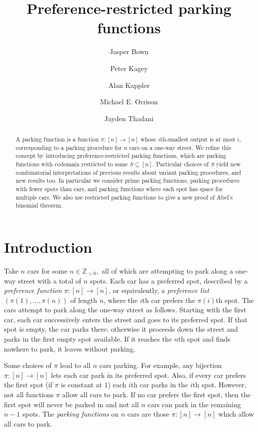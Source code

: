 \documentclass[12pt]{article}
\title{Preference-restricted parking functions}
\author{Jasper Bown \authornote{1} \and Peter Kagey \authornote{2} \and Alan Kappler \authornote{3} \and Michael E. Orrison \authornote{3} \and Jayden Thadani \authornote{3}}
\begin{document}
\maketitle

\begin{abstract}
     A parking function is a function $\pi:[n]\to [n]$ whose $i$th-smallest output is at most $i,$ corresponding to a parking procedure for $n$ cars on a one-way street. We refine this concept by introducing preference-restricted parking functions, which are parking functions with codomain restricted to some $S\subseteq[n]$. Particular choices of $S$ yield new combinatorial interpretations of previous results about variant parking procedures, and new results too. In particular we consider prime parking functions, parking procedures with fewer spots than cars, and parking functions where each spot has space for multiple cars. We also use restricted parking functions to give a new proof of Abel's binomial theorem.
\end{abstract}

\section{Introduction} \label{sec:intro}

Take $n$ cars for some $n\in\mathbb{Z}_{> 0},$ all of which are attempting to park along a one-way street with a total of $n$ spots. Each car has a preferred spot, described by a \emph{preference function} $\pi:[n]\to[n]$, or equivalently, a \emph{preference list} $(\pi(1), \dots, \pi(n))$ of length $n$, where the $i$th car prefers the $\pi(i)$th spot. The cars attempt to park along the one-way street as follows. Starting with the first car, each car successively enters the street and goes to its preferred spot. If that spot is empty, the car parks there; otherwise it proceeds down the street and parks in the first empty spot available. If it reaches the $n$th spot and finds nowhere to park, it leaves without parking.

Some choices of $\pi$ lead to all $n$ cars parking. For example, any bijection $\pi:[n]\to[n]$ lets each car park in its preferred spot. Also, if every car prefers the first spot (if $\pi$ is constant at $1$) each $i$th car parks in the $i$th spot. However, not all functions $\pi$ allow all cars to park. If no car prefers the first spot, then the first spot will never be parked in and not all $n$ cars can park in the remaining $n-1$ spots. The \emph{parking functions} on $n$ cars are those $\pi : [n] \to [n]$  which allow all cars to park.
\end{document}
